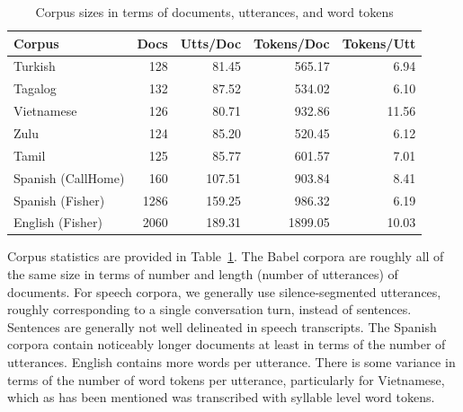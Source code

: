 \begin{table}[t]
\begin{center}
   \begin{tabular}{lrrrr}\toprule
   \textbf{Corpus}  &  \textbf{Docs} & \textbf{Utts/Doc} & \textbf{Tokens/Doc} & \textbf{Tokens/Utt}\\ \midrule
   Turkish & 128 & 81.45 & 565.17 & 6.94 \\
   \rowcolor{blue!5} Tagalog & 132 & 87.52 & 534.02 & 6.10 \\
   Vietnamese & 126 & 80.71 & 932.86 & 11.56 \\
   \rowcolor{blue!5}   Zulu & 124 & 85.20 & 520.45 & 6.12 \\
   Tamil & 125 & 85.77 & 601.57 & 7.01 \\
   \rowcolor{blue!5}   Spanish (CallHome) & 160 & 107.51 & 903.84 & 8.41	\\
   Spanish (Fisher) & 1286 & 159.25 & 986.32 & 6.19 \\
   \rowcolor{blue!5} English (Fisher) & 2060 & 189.31 & 1899.05 & 10.03 \\\bottomrule
  \end{tabular}
\caption[Corpus sizes, conversational speech]{Corpus sizes in terms of documents, utterances, and word tokens\label{fig6:cstats}}
\end{center}

\end{table}

Corpus statistics are provided in Table~\ref{fig6:cstats}.  The Babel corpora are roughly all of the same size in terms of number and length (number of utterances) of documents.  For speech corpora, we generally use silence-segmented utterances, roughly corresponding to a single conversation turn, instead of sentences.  Sentences are generally not well delineated in speech transcripts.  The Spanish corpora contain noticeably longer documents at least in terms of the number of utterances.  English contains more words per utterance.  There is some variance in terms of the number of word tokens per utterance, particularly for Vietnamese, which as has been mentioned was transcribed with syllable level word tokens.  %

